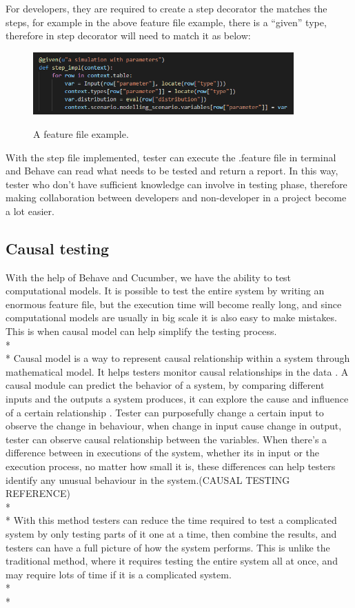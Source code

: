 For developers, they are required to create a step decorator the matches the steps, for example in the above feature file example, there is a “given” type, therefore in step decorator will need to match it as below:
\begin{figure}[h]
	\centering
	\includegraphics[width=10cm]{figures/stepFile.png}\\
	\caption{A feature file example.}
	\label{fig:figure1}
\end{figure}

With the step file implemented, tester can execute the .feature file in terminal and Behave can read what needs to be tested and return a report. In this way, tester who don’t have sufficient knowledge can involve in testing phase, therefore making collaboration between developers and non-developer in a project become a lot easier.

\subsection{Causal testing}
With the help of Behave and Cucumber, we have the ability to test computational models. It is possible to test the entire system by writing an enormous feature file, but the execution time will become really long, and since computational models are usually in big scale it is also easy to make mistakes. This is when causal model can help simplify the testing process. \\*\\*
Causal model is a way to represent causal relationship within a system through mathematical model. It helps testers monitor causal relationships in the data \cite{Reference11}. A causal module can predict the behavior of a system, by comparing different inputs and the outputs a system produces, it can explore the cause and influence of a certain relationship \cite{Reference12}. Tester can purposefully change a certain input to observe the change in behaviour, when change in input cause change in output, tester can observe causal relationship between the variables. When there’s a difference between in executions of the system, whether its in input or the execution process, no matter how small it is, these differences can help testers identify any unusual behaviour in the system.(CAUSAL TESTING REFERENCE) \\*\\*
With this method testers can reduce the time required to test a complicated system by only testing parts of it one at a time, then combine the results, and testers can have a full picture of how the system performs. This is unlike the traditional method, where it requires testing the entire system all at once, and may require lots of time if it is a complicated system. \\*\\*

